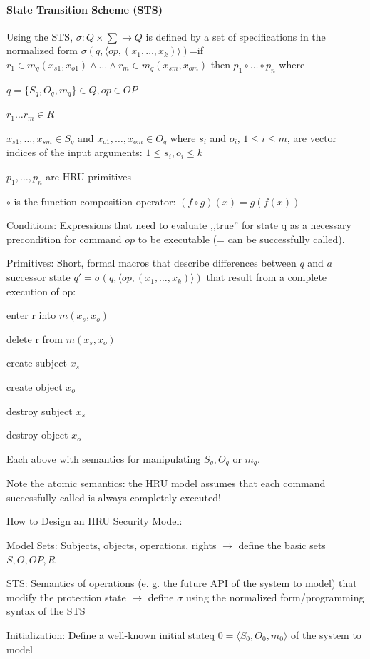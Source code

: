 \documentclass[a4paper]{article}
\begin{document}
\begin{multicols}{3}
    \paragraph{State Transition Scheme (STS)}
    Using the STS, $\sigma:Q\times\sum\rightarrow Q$ is defined by a set of specifications in the normalized form
    $\sigma(q,\langle op,(x_1,\dots ,x_k)\rangle )$=if $r_1\in m_q(x_{s1},x_{o1}) \wedge \dots  \wedge r_m\in m_q(x_{sm},x_{om})$ then $p_1\circ \dots \circ p_n$ where
    \begin{itemize*}
        \item $q=\{S_q,O_q,m_q\}\in Q,op\in OP$
        \item $r_1 \dots r_m\in R$
        \item $x_{s1},\dots ,x_{sm}\in S_q$ and $x_{o1},\dots ,x_{om}\in O_q$ where $s_i$ and $o_i$, $1\leq i\leq m$, are vector indices of the input arguments: $1\leq s_i,o_i\leq k$
        \item $p_1,\dots ,p_n$ are HRU primitives
        \item $\circ$ is the function composition operator: $(f\circ g)(x)=g(f(x))$
    \end{itemize*}

    Conditions: Expressions that need to evaluate ,,true'' for state q as a necessary precondition for command $op$ to be executable (= can be successfully called).

    Primitives: Short, formal macros that describe differences between $q$ and $a$ successor state $q'=\sigma(q,\langle op,(x_1 ,\dots ,x_k)\rangle )$ that result from a complete execution of op:
    \begin{itemize*}
        \item enter r into $m(x_s,x_o)$
        \item delete r from $m(x_s,x_o)$
        \item create subject $x_s$
        \item create object $x_o$
        \item destroy subject $x_s$
        \item destroy object $x_o$
        \item Each above with semantics for manipulating $S_q, O_q$ or $m_q$.
    \end{itemize*}

    Note the atomic semantics: the HRU model assumes that each command successfully called is always completely executed!

    How to Design an HRU Security Model:
    \begin{enumerate*}
        \item Model Sets: Subjects, objects, operations, rights $\rightarrow$ define the basic sets $S,O,OP,R$
        \item STS: Semantics of operations (e. g. the future API of the system to model) that modify the protection state $\rightarrow$ define $\sigma$ using the normalized form/programming syntax of the STS
        \item Initialization: Define a well-known initial stateq $0 =\langle S_0 ,O_0 ,m_0 \rangle$ of the system to model
    \end{enumerate*}


\end{multicols}
\end{document}

